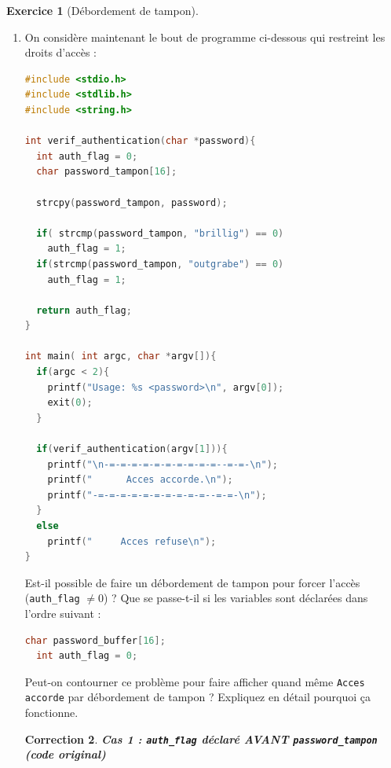 \documentclass[a4paper,11pt]{article}
\theoremstyle{plain}
\newtheorem{correction}{Correction}
\theoremstyle{definition}
\newtheorem{exercice}{Exercice}
\begin{document}
\begin{exercice}[Débordement de tampon]
\begin{enumerate}
\begin{correction}
On voit clairement la disposition mémoire : les \texttt{A} dans \texttt{tampon\_deux}, les \texttt{B} dans \texttt{tampon\_un}, et les \texttt{C} qui débordent sur \texttt{valeur} et au-delà.

\begin{pointcle}
La pile croît vers les adresses basses, mais les tableaux sont remplis vers les adresses hautes. Ainsi, un débordement de \texttt{tampon\_deux} écrase d'abord \texttt{tampon\_un} (adresse supérieure), puis \texttt{valeur}, puis \texttt{savedRBP} et \texttt{savedRIP}.
\end{pointcle}
\end{correction}


\item  On considère maintenant le bout de programme ci-dessous qui restreint les droits d'accès :

\begin{lstlisting}[language=C]
#include <stdio.h>
#include <stdlib.h>
#include <string.h>

int verif_authentication(char *password){
  int auth_flag = 0;
  char password_tampon[16];

  strcpy(password_tampon, password);

  if( strcmp(password_tampon, "brillig") == 0)
    auth_flag = 1;
  if(strcmp(password_tampon, "outgrabe") == 0)
    auth_flag = 1;

  return auth_flag;
}

int main( int argc, char *argv[]){
  if(argc < 2){
    printf("Usage: %s <password>\n", argv[0]);
    exit(0);
  }

  if(verif_authentication(argv[1])){
    printf("\n-=-=-=-=-=-=-=-=-=-=--=-=-\n");
    printf("      Acces accorde.\n");
    printf("-=-=-=-=-=-=-=-=-=-=--=-=-\n");
  }
  else
    printf("     Acces refuse\n");
}
\end{lstlisting}
Est-il possible de faire un débordement de tampon pour forcer l'accès (\texttt{auth\_flag} $\neq 0$) ? Que se passe-t-il si les variables sont déclarées dans l'ordre suivant :
\begin{lstlisting}[language=C,numbers=none]
  char password_buffer[16];
  int auth_flag = 0;
\end{lstlisting}
Peut-on contourner ce problème pour faire afficher quand même \texttt{Acces accorde} par débordement de tampon ? Expliquez en détail pourquoi ça fonctionne.

\begin{correction}
\textbf{Cas 1 : \texttt{auth\_flag} déclaré AVANT \texttt{password\_tampon} (code original)}


\end{correction}
\end{enumerate}
\end{exercice}
\end{document}
